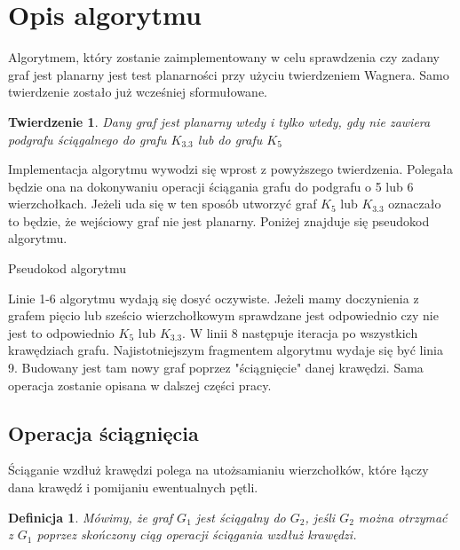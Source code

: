 \documentclass[a4 122pt]{article}
\newtheorem{twierdzenie}{Twierdzenie}
\newtheorem{definicja}{Definicja}
\newenvironment{algorytm}[1][htb]
  {\renewcommand{\algorithmcfname}{Algorytm}%
   \begin{algorithm}[#1]%
  }{\end{algorithm}}
\begin{document}
	\section{Opis algorytmu}	
	Algorytmem, który zostanie zaimplementowany w celu sprawdzenia czy zadany graf jest planarny jest test planarności przy użyciu twierdzeniem Wagnera. 
	Samo twierdzenie zostało już wcześniej sformułowane. 
	\begin{twierdzenie}
	Dany graf jest planarny wtedy i tylko wtedy, gdy nie zawiera podgrafu ściągalnego do grafu $K_{3.3}$ lub do grafu $ K_5 $
	\end{twierdzenie}
	Implementacja algorytmu wywodzi się wprost z powyższego twierdzenia. 
	Polegała będzie ona na dokonywaniu operacji ściągania grafu do podgrafu o 5 lub 6 wierzchołkach.
	Jeżeli uda się w ten sposób utworzyć graf $ K_5 $ lub $K_{3.3}$ oznaczało to będzie, że wejściowy graf nie jest planarny.
	Poniżej znajduje się pseudokod algorytmu.
	
	
	\begin{algorytm}[H]
	\newcommand{\forcond}{$i=0$ \KwTo $n$}
	\caption{Pseudokod algorytmu}
	\end{algorytm}
	
	Linie 1-6 algorytmu wydają się dosyć oczywiste. Jeżeli mamy doczynienia z grafem pięcio lub sześcio wierzchołkowym sprawdzane 
	jest odpowiednio czy nie jest to odpowiednio $K_5$ lub $K_{3.3}$. W linii 8 następuje iteracja po wszystkich krawędziach grafu. 
	Najistotniejszym fragmentem algorytmu wydaje się być linia 9. Budowany jest tam nowy graf poprzez "ściągnięcie" danej krawędzi. 
	Sama operacja zostanie opisana w dalszej części pracy.
	
	\subsection{Operacja ściągnięcia}
		Ściąganie wzdłuż krawędzi polega na utożsamianiu wierzchołków, które łączy dana krawędź i pomijaniu ewentualnych pętli. 
 		
		\begin{definicja}
			Mówimy, że graf $G_1$ jest ściągalny do $G_2$, jeśli $G_2$ można otrzymać z $G_1$ poprzez skończony ciąg operacji ściągania wzdłuż krawędzi.
		\end{definicja}
		
\end{document}
